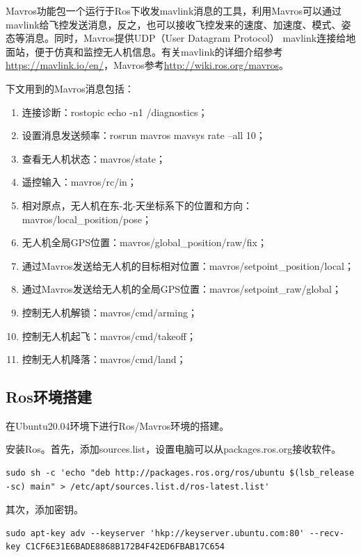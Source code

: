 Mavros功能包一个运行于Ros下收发mavlink消息的工具，利用Mavros可以通过mavlink给飞控发送消息，反之，也可以接收飞控发来的速度、加速度、模式、姿态等消息。同时，Mavros提供UDP（User Datagram Protocol） mavlink连接给地面站，便于仿真和监控无人机信息。有关mavlink的详细介绍参考\href{https://mavlink.io/en/}{https://mavlink.io/en/}，Mavros参考\href{http://wiki.ros.org/mavros}{http://wiki.ros.org/mavros}。

下文用到的Mavros消息包括：
\begin{enumerate}
    \item 连接诊断：rostopic echo -n1 /diagnostics；
    \item 设置消息发送频率：rosrun mavros mavsys rate --all 10；
    \item 查看无人机状态：mavros/state；
    \item 遥控输入：mavros/rc/in；
    \item 相对原点，无人机在东-北-天坐标系下的位置和方向：mavros/local\_position/pose；
    \item 无人机全局GPS位置：mavros/global\_position/raw/fix；
    \item 通过Mavros发送给无人机的目标相对位置：mavros/setpoint\_position/local；
    \item 通过Mavros发送给无人机的全局GPS位置：mavros/setpoint\_raw/global；
    \item 控制无人机解锁：mavros/cmd/arming；
    \item 控制无人机起飞：mavros/cmd/takeoff；
    \item 控制无人机降落：mavros/cmd/land；
\end{enumerate}

\subsection{Ros环境搭建}
在Ubuntu20.04环境下进行Ros/Mavros环境的搭建。

安装Ros。首先，添加sources.list，设置电脑可以从packages.ros.org接收软件。
\begin{lstlisting}[style = lstStyleBase]
sudo sh -c 'echo "deb http://packages.ros.org/ros/ubuntu $(lsb_release -sc) main" > /etc/apt/sources.list.d/ros-latest.list'
\end{lstlisting}

其次，添加密钥。
\begin{lstlisting}[style = lstStyleBase]
sudo apt-key adv --keyserver 'hkp://keyserver.ubuntu.com:80' --recv-key C1CF6E31E6BADE8868B172B4F42ED6FBAB17C654
\end{lstlisting}

